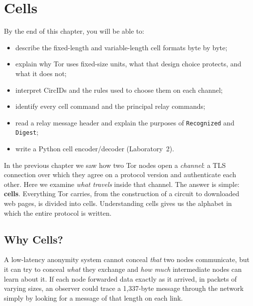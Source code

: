 \chapter{Cells}\label{cap:08-celle}

\begin{obiettivi}
By the end of this chapter, you will be able to:
\begin{itemize}[nosep]
  \item describe the fixed-length and variable-length cell formats byte by byte;
  \item explain why Tor uses fixed-size units, what that design choice protects, and what it does not;
  \item interpret CircIDs and the rules used to choose them on each channel;
  \item identify every cell command and the principal relay commands;
  \item read a relay message header and explain the purposes of \texttt{Recognized} and \texttt{Digest};
  \item write a Python cell encoder/decoder (Laboratory~2).
\end{itemize}
\end{obiettivi}

In the previous chapter we saw how two Tor nodes open a \emph{channel}: a TLS connection over which they agree on a protocol version and authenticate each other. Here we examine \emph{what travels} inside that channel. The answer is simple: \textbf{cells}. Everything Tor carries, from the construction of a circuit to downloaded web pages, is divided into cells. Understanding cells gives us the alphabet in which the entire protocol is written.

\section{Why Cells?}\label{sec:celle-perche}

A low-latency anonymity system cannot conceal \emph{that} two nodes communicate, but it can try to conceal \emph{what} they exchange and \emph{how much} intermediate nodes can learn about it. If each node forwarded data exactly as it arrived, in packets of varying sizes, an observer could trace a 1,337-byte message through the network simply by looking for a message of that length on each link.

